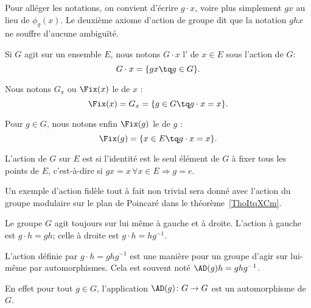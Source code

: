 Pour alléger les notations, on convient d'écrire $g \cdot x$, voire plus simplement $gx$ au lieu de \( \phi_g(x) \). Le deuxième axiome d'action de groupe dit que la notation $ghx$ ne souffre d'aucune ambiguïté.

\begin{definition}

    Si \( G\) agit sur un ensemble \( E\), nous notons \( G\cdot x\) l' de \( x\in E\) sous l'action de $G$:
\begin{equation*}
    G\cdot x = \{ gx \tq g \in G\}.
\end{equation*}

Nous notons \( G_x\) ou \( \Fix(x)\) le  de \( x\) :
\begin{equation}
    \Fix(x)=G_x=\{ g\in G\tq g\cdot x=x \}.
\end{equation}

    Pour \( g\in G\), nous notons enfin \( \Fix(g)\) le  de \( g\) :
\begin{equation}
    \Fix(g)=\{ x\in E\tq g\cdot x=x \}.
\end{equation}

\end{definition}

\begin{definition}  \label{DefuyYJRh}
    L'action de \( G\) sur \( E\) est  si l'identité est le seul élément de \( G\) à fixer tous les points de \( E\), c'est-à-dire si \( gx=x\,\forall x\in E\Rightarrow g=e\).
\end{definition}

Un exemple d'action fidèle tout à fait non trivial sera donné avec l'action du groupe modulaire sur le plan de Poincaré dans le théorème~\ref{ThoItqXCm}.

Le groupe \( G\) agit toujours sur lui même à gauche et à droite. L'action à gauche est \( g\cdot h=gh\); celle à droite est \( g\cdot h=hg^{-1}\).

\begin{definition}      \label{DEFooCORTooEeOLPT}
    L'action  définie par \( g\cdot h=ghg^{-1}\) est une manière pour un groupe d'agir sur lui-même par automorphismes. Cela est souvent noté \( \AD(g)h=ghg^{-1}\).
\end{definition}
En effet pour tout \( g\in G\), l'application \( \AD(g)\colon G\to G\) est un automorphisme de \( G\).

